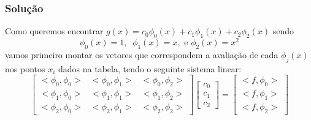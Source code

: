 \documentclass{beamer}
\theoremstyle{mystyle}
\begin{document}
	\begin{frame}
		\frametitle{Solução}
		Como queremos encontrar $ g(x) = c_{0}\phi_{0}(x) + c_{1}\phi_{1}(x) + c_{2}\phi_{2}(x) $ sendo
		\begin{equation*}
			\phi_{0}(x) = 1,\;\; \phi_{1}(x) = x, \mbox{ e } \phi_{2}(x) = x^{2}
		\end{equation*}
		vamos primeiro montar os vetores que correspondem a avaliação de cada $ \phi_{j}(x) $ nos pontos $ x_{i} $ dados na tabela, tendo o seguinte sistema linear:
		\begin{equation*}
			\left[ \begin{array}{ccc}
				<\phi_{0},\phi_{0}> & <\phi_{0},\phi_{1}> & <\phi_{0},\phi_{2}> \\
				<\phi_{1},\phi_{0}> & <\phi_{1},\phi_{1}> & <\phi_{1},\phi_{2}> \\
				<\phi_{2},\phi_{0}> & <\phi_{2},\phi_{1}> & <\phi_{2},\phi_{2}> 
			\end{array}\right]
			\left[ \begin{array}{c}
				c_{0}\\
				c_{1}\\
				c_{2}
			\end{array} \right]
			= \left[ \begin{array}{c}
				<f,\phi_{0}>\\
				<f,\phi_{1}>\\
				<f,\phi_{2}>
			\end{array} \right]
		\end{equation*}
	\end{frame}
	
\end{document}
